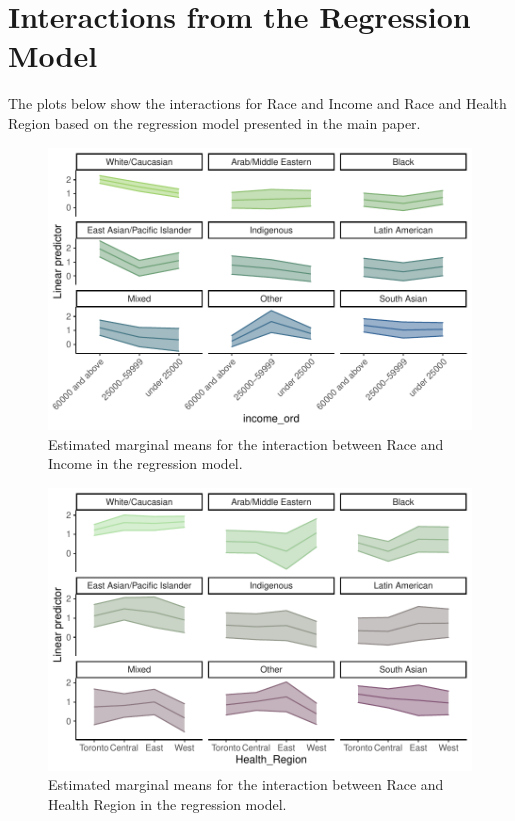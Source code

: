 \documentclass[
  letterpaper,
  DIV=11,
  numbers=noendperiod]{scrartcl}
\begin{document}
\hypertarget{interactions-from-the-regression-model}{%
\section{Interactions from the Regression
Model}\label{interactions-from-the-regression-model}}

The plots below show the interactions for Race and Income and Race and
Health Region based on the regression model presented in the main paper.

\begin{figure}

{\centering \includegraphics{appendix_files/figure-pdf/interaction-race-income-1.pdf}

}

\caption{Estimated marginal means for the interaction between Race and
Income in the regression model.}

\end{figure}

\begin{figure}

{\centering \includegraphics{appendix_files/figure-pdf/interaction-race-hr-1.pdf}

}

\caption{Estimated marginal means for the interaction between Race and
Health Region in the regression model.}

\end{figure}
\end{document}
